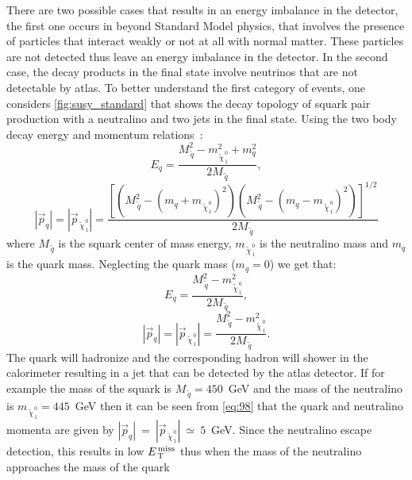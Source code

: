 There are two possible cases that results in an energy imbalance in the
detector, the first one occurs in beyond Standard Model physics, that involves
the presence of particles that interact weakly or not at all with normal
matter. These particles are not detected thus leave an energy imbalance in the
detector. In the second case, the decay products in the final state involve
neutrinos that are not detectable by \gls{atlas}\@. To better understand the
first category of events, one considers \cref{fig:susy_standard} that shows the
decay topology of squark pair production with a neutralino and two jets in the
final state. Using the two body decay energy and momentum relations~\cite{PDG}:
\begin{equation}
  \label{eq:95}
  E_q = \frac{M_{\, \tilde{q}}^2 - m_{\, \tilde{\chi}_{\, 1}^{\, 0}}^2 + m_q^2}{2
    M_{\, \tilde{q}}},
\end{equation}
\begin{equation}
  \label{eq:96}
  |\vec{p}_q| = |\vec{p}_{\, \tilde{\chi}_{\, 1}^{\, 0}}| = \frac{\left[ \left(
        M_{\, \tilde{q}}^2 - (m_q + m_{\, \tilde{\chi}_{\, 1}^{\, 0}})^2
      \right) \left( M_{\, \tilde{q}}^2 - (m_q - m_{\, \tilde{\chi}_{\, 1}^{\,
            0}})^2 \right) \right]^{1/2}}{2 M_{\, \tilde{q}}}
\end{equation}
where $M_{\, \tilde{q}}$ is the squark center of mass energy,
$m_{\, \tilde{\chi}_{\, 1}^{\, 0}}$ is the neutralino mass and $m_q$ is the
quark mass. Neglecting the quark mass ($m_q = 0$) we get that:
\begin{equation}
  \label{eq:97}
  E_q = \frac{M_{\, \tilde{q}}^2 - m_{\, \tilde{\chi}_{\, 1}^{\, 0}}^2}{2 M_{\,
      \tilde{q}}},
\end{equation}
\begin{equation}
  \label{eq:98}
  |\vec{p}_q| = |\vec{p}_{\, \tilde{\chi}_{\, 1}^{\, 0}}| = \frac{M_{\,
      \tilde{q}}^2 - m_{\, \tilde{\chi}_{\, 1}^{\, 0}}^2}{2 M_{\, \tilde{q}}}.
\end{equation}
The quark will hadronize and the corresponding hadron will shower in the
calorimeter resulting in a jet that can be detected by the \gls{atlas}
detector. If for example the mass of the squark is $M_{\, \tilde{q}} = 450$~GeV
and the mass of the neutralino is $m_{\, \tilde{\chi}_{\, 1}^{\, 0}} = 445$~GeV
then it can be seen from \cref{eq:98} that the quark and neutralino momenta are
given by $|\vec{p}_q|~=~|\vec{p}_{\, \tilde{\chi}_{\, 1}^{\,
    0}}|~\simeq~5$~GeV. Since the neutralino escape detection, this results in
low $E_\mathrm{\, T}^\mathrm{\, miss}$ thus when the mass of the neutralino approaches the mass of the quark
